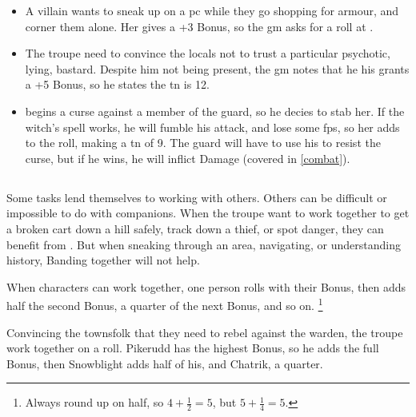 \begin{multicols}{2}
\begin{itemize}
  \item
    A villain wants to sneak up on a \gls{pc} while they go shopping for armour, and corner them alone.
    Her  gives a +3 Bonus, so the \gls{gm} asks for a  roll at \tn[10].
  \item
    The troupe need to convince the locals not to trust a particular psychotic, lying, bastard.
    Despite him not being present, the \gls{gm} notes that he his  grants a +5 Bonus, so he states the \gls{tn} is 12.
  \item
     begins a curse against a member of the \gls{guard}, so he decies to stab her.
    If the \gls{witch}'s spell works, he will fumble his attack, and lose some \glspl{fp}, so her  adds to the roll, making a \gls{tn} of 9.
    The guard will have to use his  to resist the curse, but if he wins, he will inflict Damage (covered in \autoref{combat}).
\end{itemize}

\subsection{}
\label{teamwork}
\label{banding}

Some tasks lend themselves to working with others.
Others can be difficult or impossible to do with companions.
When the troupe want to work together to get a broken cart down a hill safely, track down a thief, or spot danger, they can benefit from .
But when sneaking through an area, navigating, or understanding history, Banding together will not help.

When characters can work together, one person rolls with their Bonus, then adds half the second Bonus, a quarter of the next Bonus, and so on.%
\footnote{Always round up on half, so $4 + \frac{1}{2} = 5$, but $5 + \frac{1}{4} = 5$.}

\begin{exampletext}
  Convincing the townsfolk that they need to rebel against the \gls{warden}, the troupe work together on a  roll.
  Pikerudd has the highest Bonus, so he adds the full Bonus, then Snowblight adds half of his, and Chatrik, a quarter.
\end{exampletext}


\end{multicols}
